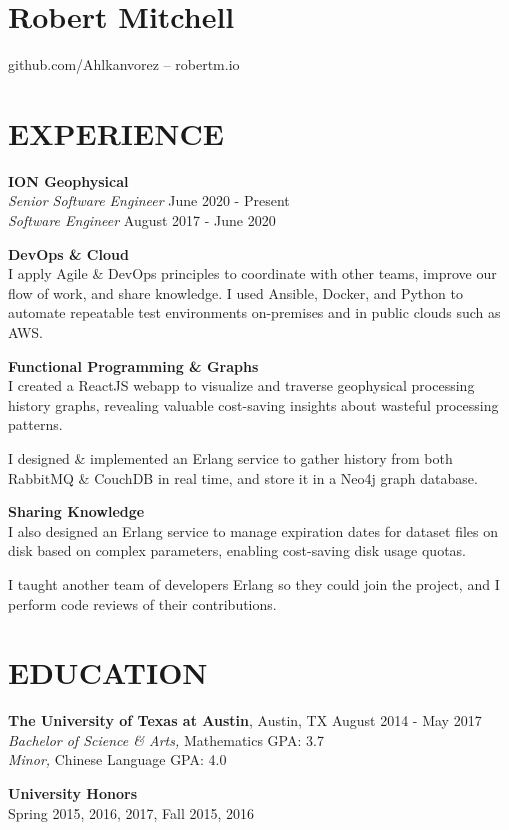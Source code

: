 \documentclass[line,margin]{res}
\begin{document}
\section{Robert Mitchell}
\hfill github.com/Ahlkanvorez -- robertm.io
\address{robert.mitchell36@gmail.com}

\begin{resume}

\section{EXPERIENCE}
    \textbf{ION Geophysical} \\
    \textit{Senior Software Engineer}
    \hfill June 2020 - Present \\
    \textit{Software Engineer}
    \hfill August 2017 - June 2020

    \textbf{DevOps \& Cloud} \\
    I apply Agile \& DevOps principles to coordinate with other teams,
    improve our flow of work, and share knowledge. I used Ansible,
    Docker, and Python to automate repeatable test environments
    on-premises and in public clouds such as AWS.

    \textbf{Functional Programming \& Graphs} \\
    I created a ReactJS webapp to visualize and traverse geophysical
    processing history graphs, revealing valuable cost-saving insights
    about wasteful processing patterns.

    I designed \& implemented an Erlang service to gather history from
    both RabbitMQ \& CouchDB in real time, and store it in a Neo4j
    graph database.

    \textbf{Sharing Knowledge} \\
    I also designed an Erlang service to manage expiration dates for
    dataset files on disk based on complex parameters, enabling
    cost-saving disk usage quotas.

    I taught another team of developers Erlang so they could join the
    project, and I perform code reviews of their contributions. \\


\section{EDUCATION}
    \textbf{The University of Texas at Austin}, Austin, TX 	\hfill August 2014 - May 2017 \\
    \textit{Bachelor of Science \& Arts,} Mathematics \hfill GPA: 3.7 \\
    \textit{Minor,} Chinese Language \hfill GPA:    4.0
    \begin{description}
        \item \textbf{University Honors} \hfill \\
            Spring 2015, 2016, 2017, Fall 2015, 2016 \\
    \end{description}



\end{resume}
\end{document}
